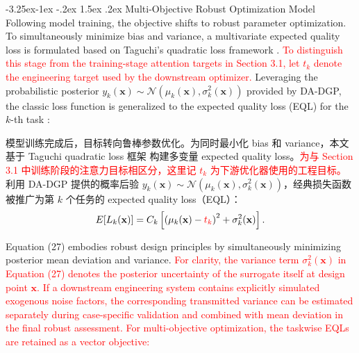 \documentclass[11pt]{article}
\makeatletter
\renewcommand\subsection{\@startsection{subsection}{2}{\z@}%
                                         {-3.25ex\@plus -1ex \@minus -.2ex}%
                                         {1.5ex \@plus .2ex}%
                                         {\normalfont\fontfamily{phv}\fontsize{14}{17}\bfseries}}
\makeatother
\begin{document}
\subsection{Multi-Objective Robust Optimization Model} \label{s:sec3.3}
Following model training, the objective shifts to robust parameter optimization. To simultaneously minimize bias and variance, a multivariate expected quality loss is formulated based on Taguchi's quadratic loss framework \citep{Taguchi1986}. \textcolor{red}{To distinguish this stage from the training-stage attention targets in Section 3.1, let $t_k$ denote the engineering target used by the downstream optimizer.} Leveraging the probabilistic posterior $y_{k}(\mathbf{x})\sim\mathcal{N}(\mu_{k}(\mathbf{x}),\sigma _{k}^{2}(\mathbf{x}))$ provided by DA-DGP, the classic loss function is generalized to the expected quality loss (EQL) for the $k$-th task \citep{Tan2012, Jiang2021}:

模型训练完成后，目标转向鲁棒参数优化。为同时最小化 bias 和 variance，本文基于 Taguchi quadratic loss 框架 \citep{Taguchi1986} 构建多变量 expected quality loss。\textcolor{red}{为与 Section 3.1 中训练阶段的注意力目标相区分，这里记 $t_k$ 为下游优化器使用的工程目标。}利用 DA-DGP 提供的概率后验 $y_{k}(\mathbf{x})\sim\mathcal{N}(\mu_{k}(\mathbf{x}),\sigma _{k}^{2}(\mathbf{x}))$，经典损失函数被推广为第 $k$ 个任务的 expected quality loss（EQL）\citep{Tan2012, Jiang2021}：
\begin{equation}
	E[{L_k}({\bf{x}})] = {C_k}\left[ {{{({\mu _k}({\bf{x}}) - \textcolor{red}{t_k})}^2} + \sigma _k^2({\bf{x}})} \right].
\end{equation}

Equation (27) embodies robust design principles by simultaneously minimizing posterior mean deviation and variance. \textcolor{red}{For clarity, the variance term $\sigma _k^2(\mathbf{x})$ in Equation (27) denotes the posterior uncertainty of the surrogate itself at design point $\mathbf{x}$. If a downstream engineering system contains explicitly simulated exogenous noise factors, the corresponding transmitted variance can be estimated separately during case-specific validation and combined with mean deviation in the final robust assessment.} \textcolor{red}{For multi-objective optimization, the taskwise EQLs are retained as a vector objective:}%
\end{document}
